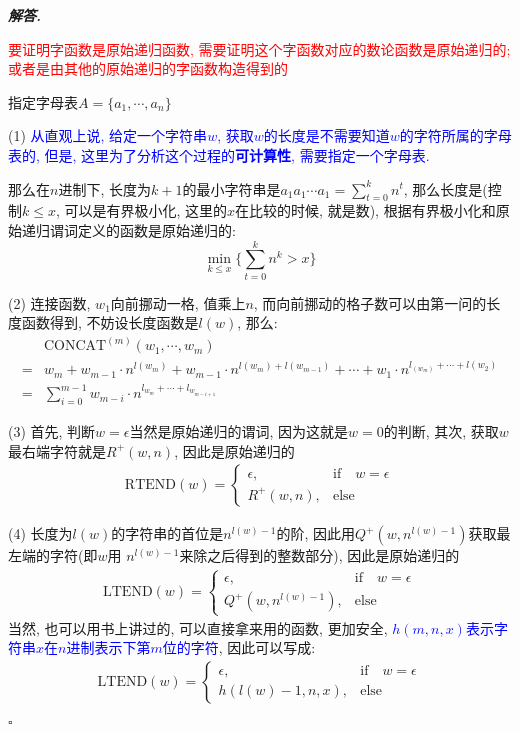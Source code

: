 \documentclass[10pt, a4paper, oneside]{ctexart}
\newenvironment{solution}{%
  \par\noindent\textbf{\textit{解答. }}\ignorespaces
}{%
  \hfill\ensuremath{\square}\par
}
\begin{document}
\begin{solution}
\textcolor{red}{要证明字函数是原始递归函数, 需要证明这个字函数对应的数论函数是原始递归的; 或者是由其他的原始递归的字函数构造得到的}

指定字母表$A=\{a_1,\cdots,a_n\}$

(1) \textcolor{blue}{从直观上说, 给定一个字符串$w$, 获取$w$的长度是不需要知道$w$的字符所属的字母表的, 但是, 这里为了分析这个过程的\textbf{可计算性}, 需要指定一个字母表.}

那么在$n$进制下, 长度为$k+1$的最小字符串是$a_1a_1\cdots a_1=\sum_{t=0}^k n^{t}$, 那么长度是(控制$k\leq x$, 可以是有界极小化, 这里的$x$在比较的时候, 就是数), 根据有界极小化和原始递归谓词定义的函数是原始递归的:
$$\min_{ k\leq x } \{\sum_{t=0}^k n^k > x \} $$

(2) 连接函数, $w_1$向前挪动一格, 值乘上$n$, 而向前挪动的格子数可以由第一问的长度函数得到, 不妨设长度函数是$l(w)$, 那么: 
\begin{align*}
    &\text{CONCAT}^{(m)}(w_1,\cdots,w_m)\\
    =& w_m + w_{m-1}\cdot n^{l(w_m)}+ w_{m-1}\cdot n^{l(w_m)+l(w_{m-1})}+\cdots+w_1\cdot n^{l_(w_m)+\cdots+l(w_2)}\\
    =& \sum_{i=0}^{m-1} w_{m-i}\cdot n^{l_{w_m}+\cdots+l_{w_{m-i+1}}}
\end{align*}

(3) 首先, 判断$w=\epsilon$当然是原始递归的谓词, 因为这就是$w=0$的判断, 其次, 获取$w$最右端字符就是$R^{+}(w,n)$, 因此是原始递归的 
\begin{align*}
    \text{RTEND}(w)=\begin{cases}
        \epsilon, &\text{if} \quad w=\epsilon\\
        R^+(w,n), &\text{else} 
    \end{cases}
\end{align*}

(4) 长度为$l(w)$的字符串的首位是$n^{l(w)-1}$的阶, 因此用$Q^+(w,n^{l(w)-1})$获取最左端的字符(即$w$用 $n^{l(w)-1}$来除之后得到的整数部分), 因此是原始递归的 
\begin{align*}
    \text{LTEND}(w)=\begin{cases}
        \epsilon, &\text{if} \quad w=\epsilon\\
        Q^+(w,n^{l(w)-1}), &\text{else} 
    \end{cases}
\end{align*}
当然, 也可以用书上讲过的, 可以直接拿来用的函数, 更加安全, \textcolor{blue}{$h(m,n,x)$表示字符串$x$在$n$进制表示下第$m$位的字符}, 因此可以写成:
\begin{align*}
    \text{LTEND}(w)=\begin{cases}
        \epsilon, &\text{if} \quad w=\epsilon\\
        h(l(w)-1,n,x), &\text{else} 
    \end{cases}
\end{align*}


\end{solution}
\end{document}
